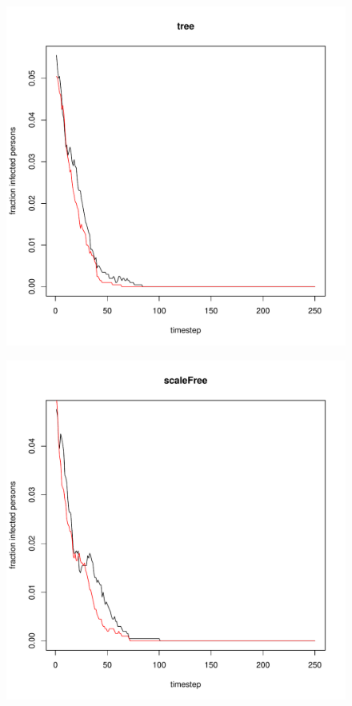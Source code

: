 \documentclass[paper=a4, fontsize=11pt]{scrartcl} %
\begin{document}
\begin{figure}[htbp] %
   \centering
   \includegraphics[width=\textwidth]{thresholdSimulation_tree} 
   \label{tree}
\end{figure}
\begin{figure}[htbp] %
   \centering
   \includegraphics[width=\textwidth]{thresholdSimulation_scaleFree} 
   \label{scaleFree}
\end{figure}
\end{document}
